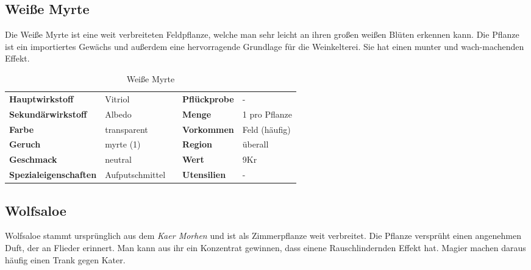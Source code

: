 \subsection{Weiße Myrte}
Die Weiße Myrte ist eine weit verbreiteten Feldpflanze, welche man sehr leicht an ihren großen weißen Blüten erkennen kann. Die Pflanze ist ein importiertes Gewächs und außerdem eine hervorragende Grundlage für die Weinkelterei. Sie hat einen munter und wach-machenden Effekt.
\newpage
\begin{table}[h] 
\begin{center} 
\begin{tabular}{|l|l|p{1cm}|l|l|} 
  	\cline{1-2} \cline{4-5} 
  	\textbf{Hauptwirkstoff} & Vitriol && \textbf{Pflückprobe} & - \\ \cline{1-2} \cline{4-5} 
  	\textbf{Sekundärwirkstoff} & Albedo && \textbf{Menge} & 1 pro Pflanze \\ \cline{1-2} \cline{4-5} 
  	\textbf{Farbe} & transparent && \textbf{Vorkommen} & Feld (häufig) \\ \cline{1-2} \cline{4-5} 
  	\textbf{Geruch} & myrte (1) && \textbf{Region} & überall \\ \cline{1-2} \cline{4-5} 
  	\textbf{Geschmack} & neutral && \textbf{Wert} & 9Kr \\ \cline{1-2} \cline{4-5} 
  	\textbf{Spezialeigenschaften} & Aufputschmittel && \textbf{Utensilien} & - \\ \cline{1-2} \cline{4-5} 
\end{tabular} 
\end{center} 
\caption{Weiße Myrte} 
\label{tab:weisse_myrte} 
\end{table}


\subsection{Wolfsaloe}
Wolfsaloe stammt ursprünglich aus dem \textit{Kaer Morhen} und ist als Zimmerpflanze weit verbreitet. Die Pflanze versprüht einen angenehmen Duft, der an Flieder erinnert. Man kann aus ihr ein Konzentrat gewinnen, dass einene Rauschlindernden Effekt hat. Magier machen daraus häufig einen Trank gegen Kater.

